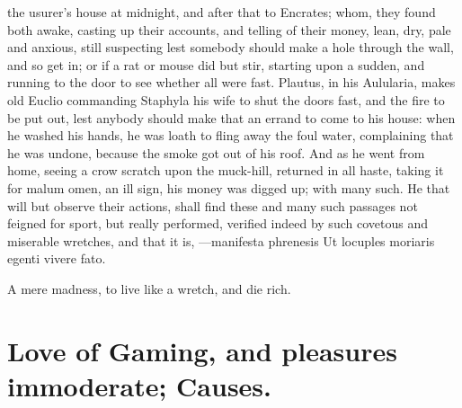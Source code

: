 {the usurer's house at midnight, and after that to Encrates; whom, they
found both awake, casting up their accounts, and telling of their
money, lean, dry, pale and anxious, still suspecting lest
somebody should make a hole through the wall, and so get in; or if a
rat or mouse did but stir, starting upon a sudden, and running to the
door to see whether all were fast. Plautus, in his Aulularia, makes old
Euclio commanding Staphyla his wife to shut the doors fast, and
the fire to be put out, lest anybody should make that an errand to come
to his house: when he washed his hands, he was loath to fling
away the foul water, complaining that he was undone, because the smoke
got out of his roof. And as he went from home, seeing a crow scratch
upon the muck-hill, returned in all haste, taking it for malum omen, an
ill sign, his money was digged up; with many such. He that will but
observe their actions, shall find these and many such passages not
feigned for sport, but really performed, verified indeed by such
covetous and miserable wretches, and that it is,
---manifesta phrenesis
Ut locuples moriaris egenti vivere fato.

A mere madness, to live like a wretch, and die rich.

\section[Love of Gaming]{Love of Gaming, \etc{} and pleasures immoderate; Causes.}

}
